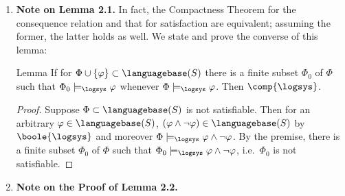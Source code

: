 \begin{enumerate}[1.]
%
\item \textbf{Note on Lemma 2.1.} In fact, the Compactness Theorem for the consequence relation and that for satisfaction are equivalent; assuming the former, the latter holds as well. We state and prove the converse of this lemma:\medskip\\
\begin{theorem}{Lemma}
If for $\Phi \cup \{ \varphi \} \subset \languagebase(S)$ there is a finite subset $\Phi_0$ of $\Phi$ such that $\Phi_0 \models_\logsys \varphi$ whenever $\Phi \models_\logsys \varphi$. Then $\comp{\logsys}$.
\end{theorem}
\begin{proof}
Suppose $\Phi \subset \languagebase(S)$ is not satisfiable. Then for an arbitrary $\varphi \in \languagebase(S)$, $(\varphi \land \neg\varphi) \in \languagebase(S)$ by $\boole{\logsys}$ and moreover $\Phi \models_\logsys \varphi \land \neg\varphi$. By the premise, there is a finite subset $\Phi_0$ of $\Phi$ such that $\Phi_0 \models_\logsys \varphi \land \neg\varphi$, i.e.\ $\Phi_0$ is not satisfiable.
\end{proof}
%
\item \textbf{Note on the Proof of Lemma 2.2.}
\end{enumerate}
